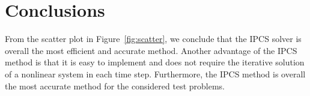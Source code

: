 \section{Conclusions}

From the scatter plot in Figure~\ref{fig:scatter}, we conclude that
the IPCS solver is overall the most efficient and accurate
method. Another advantage of the IPCS method is that it is easy to
implement and does not require the iterative solution of a nonlinear
system in each time step. Furthermore, the IPCS method is overall the
most accurate method for the considered test problems.
